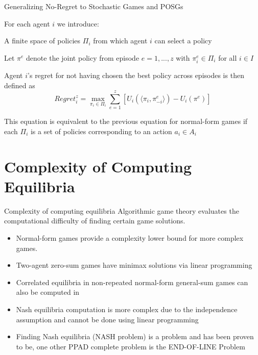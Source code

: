 \begin{frame}{Generalizing No-Regret to Stochastic Games and POSGs}

For each agent \(i\) we introduce:

\blist
    \item A finite space of policies $\Pi_i$  from which agent $i$ can select a policy
    \item Let $\pi^e$ denote the joint policy from episode $e = 1, ..., z$ with $\pi_i^e \in \Pi_i$ for all $i \in I$
    \item Agent $i$'s regret for not having chosen the best policy across episodes is then defined as
\elist
\vspace{2pt}
\[
Regret_i^{z} = \max_{\pi_i \in \Pi_i}\sum_{e = 1}^z\left[U_i(\langle \pi_i, \pi_{-i}^{e}\rangle) - U_i (\pi^e) \right]
\]

\begin{notebox}
    This equation is equivalent to the previous equation for normal-form games if each $\Pi_i$ is a set of  policies corresponding to an action $a_i \in A_i$ 
\end{notebox}

\end{frame}

\section{Complexity of Computing Equilibria}

\begin{frame}{Complexity of computing equilibria}
  Algorithmic game theory evaluates the computational difficulty of finding certain game solutions.
  \begin{itemize}
    \item Normal-form games provide a complexity lower bound for more complex games.
    \item Two-agent zero-sum games have  minimax solutions via linear programming
    \item Correlated equilibria in non-repeated normal-form general-sum games can also be computed in 
    \item Nash equilibria computation is more complex due to the independence assumption  and cannot be done using linear programming
    \item Finding Nash equilibria (NASH problem) is a  problem and has been proven to be, one other PPAD complete problem is the END-OF-LINE Problem
  \end{itemize}
\end{frame}

